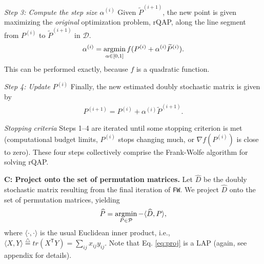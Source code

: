 \documentclass[11pt]{article}
\newcommand{\defn}{\overset{\triangle}{=}}
\newcommand{\argmin}{\operatornamewithlimits{argmin}}
\newcommand{\T}{^{\ensuremath{\mathsf{T}}}}           %
\providecommand{\mc}[1]{\mathcal{#1}}
\providecommand{\wh}[1]{\widehat{#1}}
\providecommand{\mt}[1]{\widetilde{#1}}
\newcommand{\PmcP}{P \in \mc{P}}
\begin{document}

\emph{Step 3: Compute the step size $\alpha^{(i)}$} Given $\mt{P}^{(i+1)}$, the new point is given maximizing the \emph{original} optimization problem, rQAP, along the line segment from $P^{(i)}$ to $\mt{P}^{(i+1)}$ in $\mc{D}$.    
% 
% 
% 
\begin{align}\label{eq:step}
	\alpha^{(i)} = \argmin_{\alpha \in [0,1]} f(P^{(i)} + \alpha^{(i)} \mt{P}^{(i)}).
\end{align}
This can be performed exactly, because $f$ is a quadratic function.  


\emph{Step 4: Update $P^{(i)}$} Finally, the new estimated doubly stochastic matrix is given by
\begin{align}\label{eq:update}
	P^{(i+1)} = P^{(i)} + \alpha^{(i)} \mt{P}^{(i+1)}.
\end{align}


\emph{Stopping criteria} Steps 1--4 are iterated until some stopping criterion is met (computational budget limits, $P^{(i)}$ stops changing much, or $\nabla f(P^{(i)})$ is close to zero).  These four steps collectively comprise the Frank-Wolfe algorithm for solving rQAP.  %


\textbf{C: Project onto the set of permutation matrices.}   Let $\wh{D}$ be the doubly stochastic matrix resulting from the final iteration of \texttt{FW}.  We project $\wh{D}$ onto the set of permutation matrices, yielding
\begin{align} \label{eq:proj}
	\wh{P} = \argmin_{\PmcP} -\langle \wh{D}, P \rangle,
\end{align}
where $\langle \cdot,\cdot \rangle$ %
is the usual Euclidean inner product, i.e., $\langle X,Y\rangle \defn tr(X\T Y)= \sum_{ij} x_{ij} y_{ij}$.  Note that Eq. \eqref{eq:proj} is a LAP (again, see appendix for details).
\end{document}
